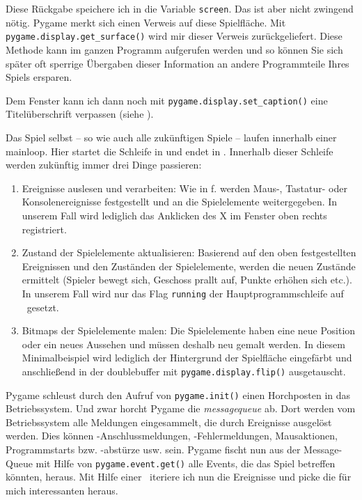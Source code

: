 Diese Rückgabe speichere ich in die Variable \texttt{screen}. Das ist aber nicht zwingend nötig. Pygame merkt sich einen Verweis auf diese Spielfläche. Mit \texttt{pygame\-.dis\-play\-.get\-\_sur\-face()} wird mir dieser Verweis zurückgeliefert. Diese Methode kann im ganzen Programm aufgerufen werden und so können Sie sich später oft sperrige Übergaben dieser Information an andere Programmteile Ihres Spiels ersparen.

Dem Fenster kann ich dann noch mit \texttt{pygame.display.set\_caption()} eine Titelüberschrift verpassen (siehe ).

Das Spiel selbst -- so wie auch alle zukünftigen Spiele -- laufen innerhalb einer \Gls{mainloop}. Hier startet die Schleife in  und endet in . Innerhalb dieser Schleife werden zukünftig immer drei Dinge passieren: 
\begin{enumerate}
	\item Ereignisse auslesen und verarbeiten: Wie in f. werden Maus-, Tastatur- oder Konsolenereignisse festgestellt und an die Spielelemente weitergegeben. In unserem Fall wird lediglich das Anklicken des X im Fenster oben rechts registriert.  
	\item Zustand der Spielelemente aktualisieren: Basierend auf den oben festgestellten Ereignissen und den Zuständen der Spielelemente, werden die neuen Zustände ermittelt (Spieler bewegt sich, Geschoss prallt auf, Punkte erhöhen sich etc.). In unserem Fall wird nur das Flag \texttt{running} der Hauptprogrammschleife auf \false\ gesetzt.
	\item Bitmaps der Spielelemente malen: Die Spielelemente haben eine neue Position oder ein neues Aussehen und müssen deshalb neu gemalt werden. In diesem Minimalbeispiel wird lediglich  der Hintergrund der Spielfläche eingefärbt und anschließend in  der \Gls{doublebuffer} mit \texttt{pygame.display.flip()} ausgetauscht.
\end{enumerate}

Pygame schleust durch den Aufruf von \texttt{py\-game.\-init()} einen Horchposten in das Betriebssystem. Und zwar horcht Pygame die \emph{\Gls{messagequeue}} ab. Dort werden vom Betriebssystem alle Meldungen eingesammelt, die durch Ereignisse ausgelöst werden. Dies können -An\-schluss\-mel\-dungen, -Fehlermeldungen, Mausaktionen, Programmstarts bzw. -abstürze  usw. sein. Pygame fischt nun aus der Message-Queue mit Hilfe von \texttt{pygame.event.get()} alle Events, die das Spiel betreffen könnten, heraus. Mit Hilfe einer \forSchleife\ iteriere ich nun die Ereignisse und picke die für mich interessanten heraus. 

